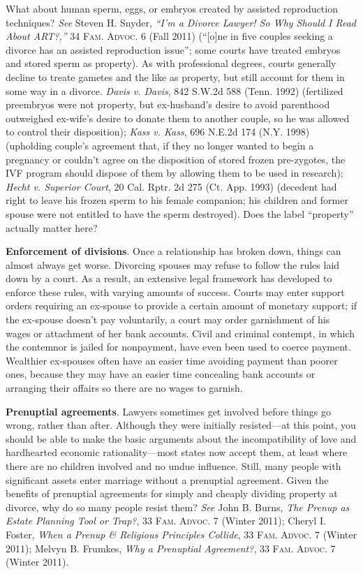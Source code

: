 What about human sperm, eggs, or embryos created by assisted reproduction
techniques? \textit{See} Steven H. Snyder, \emph{``I'm a Divorce Lawyer! So Why
Should I Read About ART?,''} 34 \textsc{Fam. Advoc.} 6 (Fall 2011) (``[o]ne in
five couples seeking a divorce has an assisted reproduction issue''; some courts
have treated embryos and stored sperm as property). As with professional
degrees, courts generally decline to treate gametes and the like as property,
but still account for them in some way in a divorce. \emph{Davis v. Davis}, 842
S.W.2d 588 (Tenn. 1992) (fertilized preembryos were not property, but
ex-husband's desire to avoid parenthood outweighed ex-wife's desire to donate
them to another couple, so he was allowed to control their disposition);
\emph{Kass v. Kass}, 696 N.E.2d 174 (N.Y. 1998) (upholding couple's agreement
that, if they no longer wanted to begin a pregnancy or couldn't agree on the
disposition of stored frozen pre-zygotes, the IVF program should dispose of them
by allowing them to be used in research); \emph{Hecht v. Superior Court}, 20
Cal. Rptr. 2d 275 (Ct. App. 1993) (decedent had right to leave his frozen sperm
to his female companion; his children and former spouse were not entitled to
have the sperm destroyed). Does the label ``property'' actually matter here?

\item
\textbf{Enforcement of divisions}. Once a relationship has broken down, things
can almost always get worse. Divorcing spouses may refuse to follow the rules
laid down by a court. As a result, an extensive legal framework has developed
to enforce these rules, with varying amounts of success. Courts may enter
support orders requiring an ex-spouse to provide a certain amount of monetary
support; if the ex-spouse doesn't pay voluntarily, a court may order
garnishment of his wages or attachment of her bank accounts. Civil and
criminal contempt, in which the contemnor is jailed for nonpayment, have even
been used to coerce payment. Wealthier ex-spouses often have an easier time
avoiding payment than poorer ones, because they may have an easier time
concealing bank accounts or arranging their affairs so there are no wages to
garnish.

\item
\textbf{Prenuptial agreements}. Lawyers sometimes get involved before things go
wrong, rather than after. Although they were initially resisted---at this point,
you should be able to make the basic arguments about the incompatibility of love
and hardhearted economic rationality---most states now accept them, at least
where there are no children involved and no undue influence. Still, many people
with significant assets enter marriage without a prenuptial agreement. Given the
benefits of prenuptial agreements for simply and cheaply dividing property at
divorce, why do so many people resist them? \textit{See} John B. Burns,
\emph{The Prenup as Estate Planning Tool or Trap?}, 33 \textsc{Fam. Advoc.} 7
(Winter 2011); Cheryl I. Foster, \emph{When a Prenup \& Religious Principles
Collide}, 33 \textsc{Fam. Advoc.} 7 (Winter 2011); Melvyn B. Frumkes, \emph{Why
a Prenuptial Agreement?}, 33 \textsc{Fam. Advoc.} 7 (Winter 2011).

